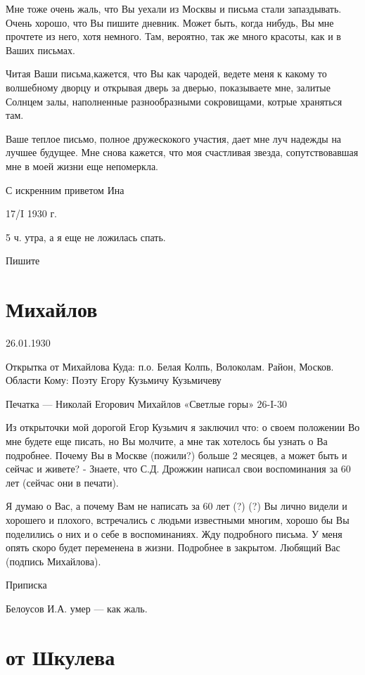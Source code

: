 \documentclass[]{memoir}
\begin{document}
Мне тоже очень жаль, что Вы уехали из Москвы и письма стали запаздывать. Очень хорошо, что Вы пишите дневник. Может быть, когда нибудь, Вы мне прочтете из него, хотя немного. Там, вероятно, так же много красоты, как и в Ваших письмах.

Читая Ваши письма,кажется, что Вы как чародей, ведете меня к какому то волшебному дворцу и открывая дверь за дверью, показываете мне, залитые Солнцем залы, наполненные разнообразными сокровищами, котрые храняться там.

Ваше теплое письмо, полное дружескокого участия, дает мне луч надежды на лучшее будущее. Мне снова кажется, что моя счастливая звезда, сопутствовавшая мне в моей жизни еще непомеркла.

С искренним приветом Ина

17/I 1930 г.

5 ч. утра, а я еще не ложилась спать.

Пишите

\section{Михайлов}

26.01.1930

Открытка от Михайлова
Куда: п.о. Белая Колпь, Волоколам. Район, Москов. Области
Кому: Поэту Егору Кузьмичу Кузьмичеву

Печатка — Николай Егорович Михайлов 
«Светлые горы» 26-I-30

Из открыточки мой дорогой Егор Кузьмич я заключил что: о своем положении Во мне будете еще писать, но Вы молчите, а мне так хотелось бы узнать о Ва  подробнее. Почему Вы в Москве (пожили?) больше 2 месяцев, а может быть и сейчас и живете? - Знаете, что С.Д. Дрожжин написал свои воспоминания за 60 лет (сейчас они  в печати).

Я думаю о Вас, а почему  Вам не написать за 60 лет (?) (?) Вы лично видели и хорошего и плохого, встречались с людьми известными многим, хорошо бы Вы поделились о них и о себе в воспоминаниях. Жду подробного письма. У меня опять скоро будет переменена в жизни. Подробнее в закрытом. Любящий Вас (подпись Михайлова).

Приписка

Белоусов И.А. умер — как жаль.


\section{от Шкулева}
\end{document}
